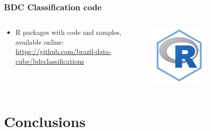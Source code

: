 \documentclass[aspectratio=169]{beamer}
\begin{document}
\begin{frame}
    \frametitle{BDC Classification code}
    \begin{columns}
        \begin{column}{0.5\textwidth}
            \begin{itemize}
                \item R packages with code and samples, available 
                    online:\newline
                    \scriptsize{\url{https://github.com/brazil-data-cube/bdcclassifications}}
            \end{itemize}
        \end{column}
        \begin{column}{0.5\textwidth}
            \begin{figure}
                \centering
                \includegraphics[width=0.7\textwidth]
                {img/r-packages.png}
            \end{figure}
        \end{column}
    \end{columns}
\end{frame}



\section{Conclusions}
\end{document}
